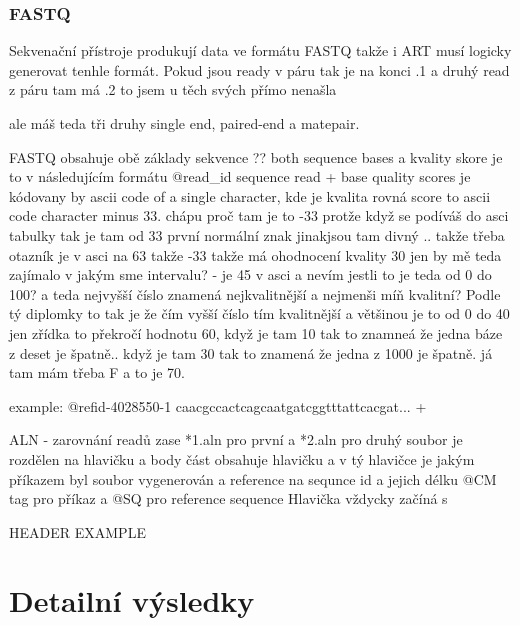 \documentclass[czech,DP]{thesiskiv}
\numberwithin{equation}{section}
\begin{document}
\subsection{FASTQ}
Sekvenační přístroje produkují data ve formátu FASTQ takže i ART musí logicky generovat tenhle formát.
Pokud jsou ready v páru tak je na konci .1
a druhý read z páru tam má .2 to jsem u těch svých přímo nenašla 

ale máš teda tři druhy single end, paired-end a matepair. 

FASTQ obsahuje obě základy sekvence ?? both sequence bases a kvality skore je to v následujícím formátu
@read\_id
sequence read
+
base quality scores je kódovany by ascii code of a single character, kde je kvalita rovná score to ascii code character minus 33. chápu proč tam je to -33 protže když se podíváš do asci tabulky tak je tam od 33 první normální znak jinakjsou tam divný .. 
takže třeba otazník je v asci na 63 takže -33 takže má ohodnocení kvality 30
jen by mě teda zajímalo v jakým sme intervalu? - je 45 v asci a nevím jestli to je teda od 0 do 100?  a teda nejvyšší číslo znamená nejkvalitnější a nejmenši míň kvalitní? Podle tý diplomky to tak je že čím vyšší číslo tím kvalitnější a většinou je to od 0 do 40 jen zřídka to překročí hodnotu 60, když je tam 10 tak to znamneá že jedna báze z deset je špatně.. když je tam 30 tak to znamená že jedna z 1000 je špatně.
já tam mám třeba F a to je 70.

example:
		@refid-4028550-1 
		caacgccactcagcaatgatcggtttattcacgat...
		+ 

ALN - zarovnání readů
zase *1.aln pro první a *2.aln pro druhý
soubor je rozdělen na hlavičku a body část
obsahuje hlavičku a v tý hlavičce je jakým příkazem byl soubor vygenerován a reference na sequnce id a jejich délku
@CM tag pro příkaz a
@SQ pro reference sequence
Hlavička vždycky začíná s 

		HEADER EXAMPLE

	


\chapter{Detailní výsledky}
\end{document}
